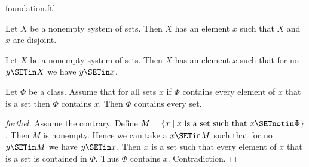 \documentclass{naproche-library}
\begin{document}
\begin{smodule}[title=The Foundation Axiom]{foundation.ftl}

\begin{axiom}[forthel,title=Foundation,id=FOUNDATIONS_10_1320008569323520]
  Let $X$ be a nonempty system of sets.
  Then $X$ has an element $x$ such that $X$ and $x$ are disjoint.
\end{axiom}

\begin{corollary}[forthel,id=FOUNDATIONS_10_9532145874510315]
  Let $X$ be a nonempty system of sets.
  Then $X$ has an element $x$ such that for no $y \SETin X$ we have $y \SETin x$.
\end{corollary}

\begin{proposition}[forthel,id=FOUNDATIONS_11_2812087589928960]
  Let $\Phi$ be a class.
  Assume that for all sets $x$ if $\Phi$ contains every element of $x$ that is a set then $\Phi$ contains $x$.
  Then $\Phi$ contains every set.
\end{proposition}
\begin{proof}[forthel]
  Assume the contrary.
  Define $M = \{ x \mid x\text{ is a set such that }x \SETnotin \Phi \}$.
  Then $M$ is nonempty.
  Hence we can take a $x \SETin M$ such that for no $y \SETin M$ we have $y \SETin x$.
  Then $x$ is a set such that every element of $x$ that is a set is contained in $\Phi$.
  Thus $\Phi$ contains $x$.
  Contradiction.
\end{proof}
\end{smodule}
\end{document}

